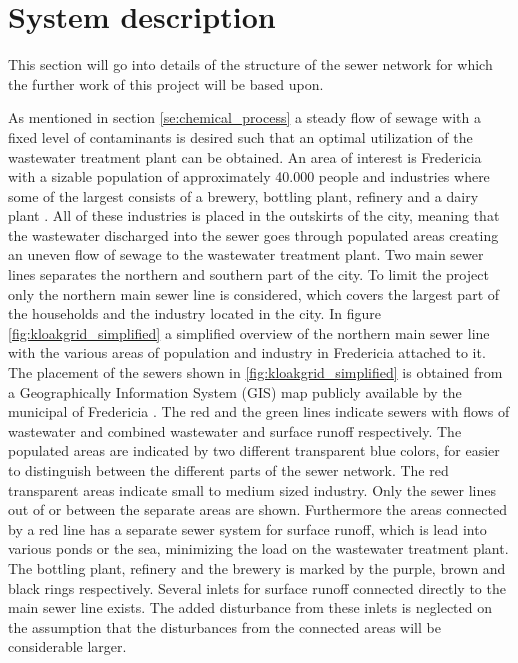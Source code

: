 \chapter{System description}\label{se:system_description}
This section will go into details of the structure of the sewer network for which the further work of this project will be based upon.

As mentioned in section \ref{se:chemical_process} a steady flow of sewage with a fixed level of contaminants is desired such that an optimal utilization of the wastewater treatment plant can be obtained. An area of interest is Fredericia with a sizable population of approximately 40.000 people and industries where some of the largest consists of a brewery, bottling plant, refinery and a dairy plant \cite{Statistic_Denmark}. All of these industries is placed in the outskirts of the city, meaning that the wastewater discharged into the sewer goes through populated areas creating an uneven flow of sewage to the wastewater treatment plant. Two main sewer lines separates the northern and southern part of the city. To limit the project only the northern main sewer line is considered, which covers the largest part of the households and the industry located in the city. %
In figure \ref{fig:kloakgrid_simplified} a simplified overview of the northern main sewer line with the various areas of population and industry in Fredericia attached to it. The placement of the sewers shown in \ref{fig:kloakgrid_simplified} is obtained from a Geographically Information System (GIS) map publicly available by the municipal of Fredericia \cite{GIS_kort}. The red and the green lines indicate sewers with flows of wastewater and combined wastewater and surface runoff respectively. The populated areas are indicated by two different transparent blue colors, for easier to distinguish between the different parts of the sewer network. The red transparent areas indicate small to medium sized industry. 
Only the sewer lines out of or between the separate areas are shown. Furthermore the areas connected by a red line has a separate sewer system for surface runoff, which is lead into various ponds or the sea, minimizing the load on the wastewater treatment plant.
The bottling plant, refinery and the brewery is marked by the purple, brown and black rings respectively. Several inlets for surface runoff connected directly to the main sewer line exists. The added disturbance from these inlets is neglected on the assumption that the disturbances from the connected areas will be considerable larger.  



